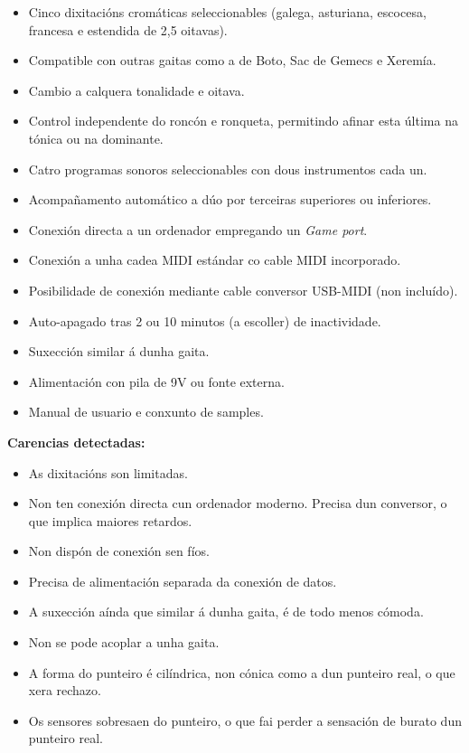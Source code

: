   \begin{itemize}
   \item Cinco dixitacións cromáticas seleccionables (galega, asturiana,
         escocesa, francesa e estendida de 2,5 oitavas).
   \item Compatible con outras gaitas como a de Boto, Sac de Gemecs e Xeremía.
   \item Cambio a calquera tonalidade e oitava.
   \item Control independente do roncón e ronqueta, permitindo afinar esta
         última na tónica ou na dominante.
   \item Catro programas sonoros seleccionables con dous instrumentos cada un.
   \item Acompañamento automático a dúo por terceiras superiores ou inferiores.
   \item Conexión directa a un ordenador empregando un \textit{Game port}.
   \item Conexión a unha cadea MIDI estándar co cable MIDI incorporado.
   \item Posibilidade de conexión mediante cable conversor USB-MIDI (non
         incluído).
   \item Auto-apagado tras 2 ou 10 minutos (a escoller) de inactividade.
   \item Suxección similar á dunha gaita.
   \item Alimentación con pila de 9V ou fonte externa.
   \item Manual de usuario e conxunto de samples.
  \end{itemize}

  \textbf{Carencias detectadas:}

  \begin{itemize}
   \item As dixitacións son limitadas.
   \item Non ten conexión directa cun ordenador moderno. Precisa dun conversor,
         o que implica maiores retardos.
   \item Non dispón de conexión sen fíos.
   \item Precisa de alimentación separada da conexión de datos.
   \item A suxección aínda que similar á dunha gaita, é de todo menos cómoda.
   \item Non se pode acoplar a unha gaita.
   \item A forma do punteiro é cilíndrica, non cónica como a dun punteiro real,
         o que xera rechazo.
   \item Os sensores sobresaen do punteiro, o que fai perder a sensación de
         burato dun punteiro real.
  \end{itemize}

